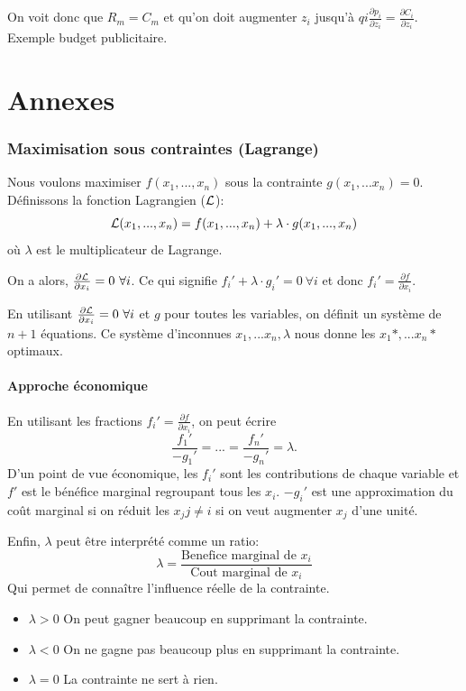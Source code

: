On voit donc que $R_m = C_m$ et qu'on doit augmenter $z_i$ jusqu'à
$qi\frac{\partial p_i}{\partial z_i} = \frac{\partial C_i}{\partial z_i}$.
Exemple budget publicitaire.


\part{Annexes}
\appendix
\section{Maximisation sous contraintes (Lagrange)}
Nous voulons maximiser $f(x_1,..., x_n)$ sous la contrainte $g(x_1,...x_n) = 0$.
Définissons la fonction Lagrangien ($\mathcal{L}$):
$$\mathcal{L}(x_1,..., x_n) = f(x_1,..., x_n) + \lambda\cdot g(x_1,..., x_n)$$
où $\lambda$ est le multiplicateur de Lagrange.

On a alors, $\frac{\partial \mathcal{L}}{\partial x_i} = 0\ \forall i$. Ce qui signifie
$f_i' + \lambda\cdot g_i' = 0\ \forall i$ et donc
$f_i' = \frac{\partial f}{\partial x_i}$.

En utilisant $\frac{\partial \mathcal{L}}{\partial x_i} = 0\ \forall i$ et $g$ pour
toutes les variables, on définit un système de $n+1$ équations. Ce système
d'inconnues $x_1,...x_n, \lambda$ nous donne les $x_1*,...x_n*$ optimaux.

\subsection{Approche économique}
En utilisant les fractions $f_i' = \frac{\partial f}{\partial x_i}$, on peut
écrire $$ \frac{f_1'}{-g_1'} = ... = \frac{f_n'}{-g_n'} = \lambda. $$
D'un point de vue économique, les $f_i'$ sont les contributions de chaque
variable et $f'$ est le bénéfice marginal regroupant tous les $x_i$.
$-g_i'$ est une approximation du coût marginal si on réduit les $x_j j\neq i$
si on veut augmenter $x_j$ d'une unité.

Enfin, $\lambda$ peut être interprété comme un ratio:
$$\lambda = \frac{\textrm{Benefice marginal de }x_i}{\textrm{Cout marginal de }x_i}$$
Qui permet de connaître l'influence réelle de la contrainte.
\begin{itemize}
\item $\lambda > 0$ On peut gagner beaucoup en supprimant la contrainte.
\item $\lambda < 0$ On ne gagne pas beaucoup plus en supprimant la contrainte.
\item $\lambda = 0$ La contrainte ne sert à rien.
\end{itemize}

